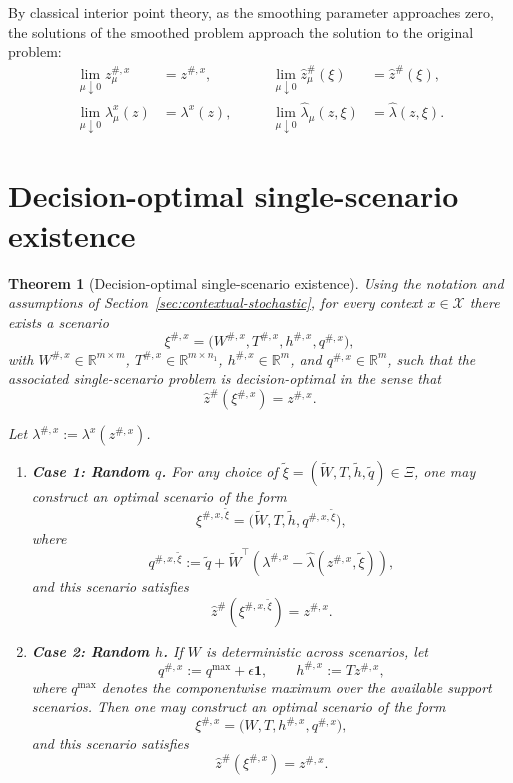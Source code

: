 \documentclass{article}
\newcommand{\R}{\mathbb{R}}
\theoremstyle{plain}
\newtheorem{theorem}{Theorem}
\begin{document}
By classical interior point theory, as the smoothing parameter approaches zero, the solutions of the
smoothed problem approach the solution to the original problem:
\begin{equation}
\label{eq:contextual-central-path}
\begin{aligned}
\lim_{\mu\downarrow 0} z_\mu^{\#,x} &= z^{\#,x},
\qquad &
\lim_{\mu\downarrow 0} \hat z_\mu^{\#}(\xi) &= \hat z^{\#}(\xi),\\
\lim_{\mu\downarrow 0} \lambda_\mu^x(z) &= \lambda^x(z),
\qquad &
\lim_{\mu\downarrow 0} \hat\lambda_\mu(z,\xi) &= \hat\lambda(z,\xi).
\end{aligned}
\end{equation}

\section{Decision-optimal single-scenario existence}
\label{sec:temp-theorem}

\begin{theorem}[Decision-optimal single-scenario existence]
Using the notation and assumptions of Section~\ref{sec:contextual-stochastic}, for every context
$x\in\mathcal X$ there exists a scenario
\[
\xi^{\#,x}=\bigl(W^{\#,x},T^{\#,x},h^{\#,x},q^{\#,x}\bigr),
\]
with $W^{\#,x}\in\R^{m\times m}$, $T^{\#,x}\in\R^{m\times n_1}$, $h^{\#,x}\in\R^m$, and $q^{\#,x}\in\R^m$, such that the associated single-scenario problem is decision-optimal in the sense that
\[
\hat z^{\#}\!\left(\xi^{\#,x}\right)=z^{\#,x}.
\]

Let $\lambda^{\#,x}:=\lambda^x(z^{\#,x})$.

\begin{enumerate}
\item \textbf{Case 1: Random $q$.} For any choice of $\tilde\xi=(\tilde W,T,\tilde h,\tilde q)\in\Xi$, one may construct an optimal scenario of the form
\[
\xi^{\#,x,\tilde\xi}=\bigl(\tilde W,T,\tilde h,q^{\#,x,\tilde\xi}\bigr),
\]
where
\[
q^{\#,x,\tilde\xi}:=\tilde q+\tilde W^\top\!\left(\lambda^{\#,x}-\hat\lambda(z^{\#,x},\tilde\xi)\right),
\]
and this scenario satisfies
\[
\hat z^{\#}\!\left(\xi^{\#,x,\tilde\xi}\right)=z^{\#,x}.
\]
\item \textbf{Case 2: Random $h$.} If $W$ is deterministic across scenarios, let
\[
q^{\#,x}:=q^{\max}+\epsilon \mathbf 1,
\qquad
h^{\#,x}:=Tz^{\#,x},
\]
where $q^{\max}$ denotes the componentwise maximum over the available support scenarios. Then one may construct an optimal scenario of the form
\[
\xi^{\#,x}=\bigl(W,T,h^{\#,x},q^{\#,x}\bigr),
\]
and this scenario satisfies
\[
\hat z^{\#}\!\left(\xi^{\#,x}\right)=z^{\#,x}.
\]
\end{enumerate}
\end{theorem}
\end{document}
